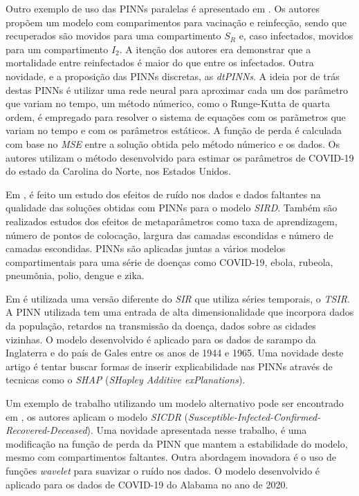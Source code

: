 Outro exemplo de uso das PINNs paralelas é apresentado em  
\cite{yang-etal:25-dtpinns-paralelas}. Os autores propõem um modelo com 
comparimentos para vacinação e reinfecção, sendo que recuperados são movidos 
para uma compartimento $S_R$ e, caso infectados, movidos para um compartimento 
$I_2$. 
A itenção dos autores era demonstrar que a mortalidade entre reinfectados é maior 
do que entre os infectados.
Outra novidade, e a proposição das PINNs discretas, as \textit{dtPINNs}. A ideia
por de trás destas PINNs é utilizar uma rede neural para aproximar cada um dos 
parâmetro que variam no tempo, um método númerico, como o Runge-Kutta de quarta
ordem, é empregado para resolver o sistema de equações com os parãmetros que 
variam no tempo e com os parâmetros estáticos. 
A função de perda é calculada com base no \textit{MSE} entre a solução obtida pelo
método númerico e os dados. 
Os autores utilizam o método desenvolvido para estimar os parâmetros de COVID-19
do estado da Carolina do Norte, nos Estados Unidos.      

Em \cite{shaier-etal:22-dinns}, é feito um estudo dos efeitos de ruído nos dados
e dados faltantes na qualidade das soluções obtidas com PINNs para o modelo 
\textit{SIRD}.
Também  são realizados estudos dos efeitos de metaparâmetros como taxa de 
aprendizagem, número de pontos de colocação, largura das camadas escondidas e 
número de camadas escondidas.
PINNs são aplicadas juntas a vários modelos compartimentais para uma série de 
doenças como COVID-19, ebola, rubeola, pneumõnia, polio, dengue e zika. 

Em \cite{madden-etal:24-time-series-sir} é utilizada uma versão diferente do 
\textit{SIR} que utiliza séries temporais, o \textit{TSIR}.
A PINN utilizada tem uma entrada de alta dimensionalidade que incorpora dados
da população, retardos na transmissão da doença, dados sobre as cidades vizinhas.
O modelo desenvolvido é aplicado para os dados de sarampo da Inglaterra e do país
de Gales entre os anos de 1944 e 1965. Uma novidade deste artigo é tentar buscar
formas de inserir explicabilidade nas PINNs através de tecnicas como o
\textit{SHAP} (\textit{SHapley Additive exPlanations}).

Um exemplo de trabalho utilizando um modelo alternativo pode ser encontrado em
\cite{hu-etal:22-identificabilidade}, os autores aplicam o modelo \textit{SICDR} 
(\textit{Susceptible-Infected-Confirmed-Recovered-Deceased}).
Uma novidade apresentada nesse trabalho, é uma modificação na função de perda
da PINN que mantem a estabilidade do modelo, mesmo com compartimentos faltantes.
Outra abordagem inovadora é o uso de funções \textit{wavelet} para suavizar o 
ruído nos dados.
O modelo desenvolvido é aplicado para os dados de COVID-19 do Alabama no ano 
de 2020. 


